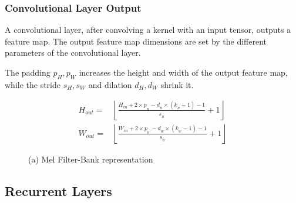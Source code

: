 \subsubsection{Convolutional Layer Output}
A convolutional layer,
after convolving a kernel with an input tensor,
outputs a feature map. The output feature map dimensions
are set by the different parameters of the convolutional layer.

The padding \( p_{H}, p_{W} \) increases the height and width of 
the output feature map, while the stride \( s_{H}, s_{W} \) 
and dilation \( d_{H}, d_{W} \) shrink it.

\begin{align}
    H_{out} =& \left\lfloor\frac{H_{in}  + 2 \times p_{_{H}} - d_{_{H}}
                        \times (k_{_{H}} - 1) - 1}{s_{_{H}}} + 1\right\rfloor  \\
    W_{out} =& \left\lfloor\frac{W_{in}  + 2 \times p_{_{W}} - d_{_{W}}
                        \times (k_{_{W}} - 1) - 1}{s_{_{W}}} + 1\right\rfloor
\end{align}

\begin{figure}[H]
    \centering
    \caption{(a) Mel Filter-Bank representation}
\end{figure}



\subsection{Recurrent Layers}
